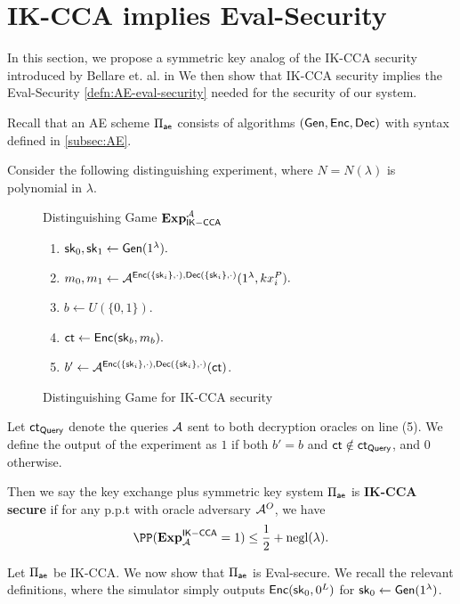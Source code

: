 \section{IK-CCA implies Eval-Security}
\label{sec:IND-CCPKA}
In this section, we propose a symmetric key analog of the IK-CCA security introduced by Bellare et. al. in \cite[Definition 1]{BBDP01keyprivate}
We then show that IK-CCA security implies the Eval-Security \cref{defn:AE-eval-security} needed for the security of our system.

Recall that an AE scheme $\Pi_{\mathsf{ae}}$ consists of algorithms $(\mathsf{Gen}, \mathsf{Enc}, \mathsf{Dec})$ with syntax defined in \cref{subsec:AE}. 

\begin{definition}[IK-CCA]
\label{defn:AE-IK-CCA}
Consider the following distinguishing experiment, where $N = N(\lambda)$ is polynomial in $\lambda$.
\begin{figure}[h!]
\begin{framed}
Distinguishing Game $\mathbf{Exp}_{\mathsf{IK-CCA}}^{\mathcal{A}}$
\begin{enumerate}
    \item ${\mathsf{sk}}_0, {\mathsf{sk}}_1 \leftarrow \mathsf{Gen}(1^{\lambda}).$
    \item $m_0, m_1 \leftarrow \mathcal{A}^{\mathsf{Enc}(\{{\mathsf{sk}}_{i}\}, \cdot), \mathsf{Dec}(\{{\mathsf{sk}}_{i}\}, \cdot)}(1^{\lambda}, kx_{i}^P).$
    \item $b \leftarrow U(\{0, 1\})$.
    \item $\mathsf{ct} \leftarrow \mathsf{Enc}({\mathsf{sk}}_b, m_b).$
    \item $b' \leftarrow \mathcal{A}^{\mathsf{Enc}(\{{\mathsf{sk}}_{i}\}, \cdot), \mathsf{Dec}(\{{\mathsf{sk}}_{i}\}, \cdot)}(\mathsf{ct})$.
\end{enumerate}
\end{framed}
\caption{Distinguishing Game for IK-CCA security}
\label{expr:AE-IKCCA-Distinguish}
\end{figure}

Let $\mathsf{ct}_{\mathsf{Query}}$ denote the queries $\mathcal{A}$ sent to both decryption oracles on line (5).  We define the output of the experiment as $1$ if both $b' = b$ and $\mathsf{ct} \notin \mathsf{ct}_{\mathsf{Query}}$, and $0$ otherwise. 

Then we say the key exchange plus symmetric key system $\Pi_{\mathsf{ae}}$ is \textbf{IK-CCA secure} if for any p.p.t with oracle adversary $\mathcal{A}^O$, we have
$$\PP(\mathbf{Exp}^{\mathsf{IK-CCA}}_{\cA} = 1) \leq \frac{1}{2} + \negl(\lambda).$$
\end{definition}

Let $\Pi_{\mathsf{ae}}$ be IK-CCA. We now show that $\Pi_{\mathsf{ae}}$ is Eval-secure. We recall the relevant definitions, where the simulator simply outputs $\mathsf{Enc}({\mathsf{sk}}_{0}, 0^{L})$ for ${\mathsf{sk}}_0 \leftarrow \mathsf{Gen}(1^{\lambda})$.

